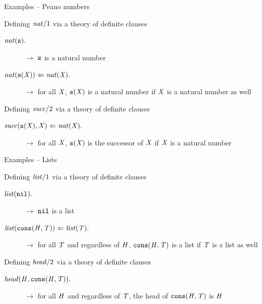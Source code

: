 \documentclass[presentation]{beamer}\mode<presentation>{\usetheme{AMSBolognaFC}}
\begin{document}
\begin{frame}{Examples -- Peano numbers}
    \begin{exampleblock}{Defining $\text{\textit{nat}}/1$ via a theory of definite clauses}
        \begin{description}
            \item[$\text{\textit{nat}}(\mathtt{z})\mathtt{.}$] $\rightarrow$ $\mathtt{z}$ is a natural number
            \item[$\text{\textit{nat}}(\mathtt{s}(\mathit{X})) \Leftarrow \text{\textit{nat}}(\mathit{X})\mathtt{.}$] $\rightarrow$ for all $\mathit{X}$, $\mathtt{s}(\mathit{X})$ is a natural number if $\mathit{X}$ is a natural number as well
        \end{description}
    \end{exampleblock}
    \begin{exampleblock}{Defining $\text{\textit{succ}}/2$ via a theory of definite clauses}
        \begin{description}
            \item[$\text{\textit{succ}}(\mathtt{s}(\mathit{X}), \mathit{X}) \Leftarrow \text{\textit{nat}}(\mathit{X}) \mathtt{.}$] $\rightarrow$ for all $\mathit{X}$, $\mathtt{s}(\mathit{X})$ is the successor of $\mathit{X}$ if $\mathit{X}$ is a natural number
        \end{description}
    \end{exampleblock}
\end{frame}

\begin{frame}{Examples -- Lists}
    \begin{exampleblock}{Defining $\text{\textit{list}}/1$ via a theory of definite clauses}
        \begin{description}
            \item[$\text{\textit{list}}(\mathtt{nil})\mathtt{.}$] $\rightarrow$ $\mathtt{nil}$ is a list
            \item[$\text{\textit{list}}(\mathtt{cons}(\mathit{H}, \mathit{T})) \Leftarrow \text{\textit{list}}(\mathit{T})\mathtt{.}$] $\rightarrow$ for all $\mathit{T}$ and regardless of $\mathit{H}$, $\mathtt{cons}(\mathit{H}, \mathit{T})$ is a list if $\mathit{T}$ is a list as well
        \end{description}
    \end{exampleblock}
    \begin{exampleblock}{Defining $\text{\textit{head}}/2$ via a theory of definite clauses}
        \begin{description}
            \item[$\text{\textit{head}}(\mathit{H}, \mathtt{cons}(\mathit{H}, \mathit{T})) \mathtt{.}$] $\rightarrow$ for all $\mathit{H}$ and regardless of $\mathit{T}$, the head of $\mathtt{cons}(\mathit{H}, \mathit{T})$ is $\mathit{H}$
        \end{description}
    \end{exampleblock}
\end{frame}
\end{document}
